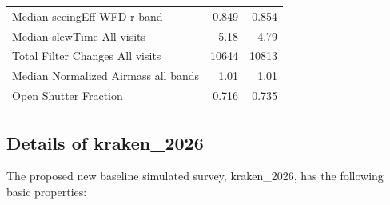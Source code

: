 \documentclass[DM,lsstdraft,authoryear,toc]{lsstdoc}
\begin{document}
\begin{table}
\begin{tabular}{lrr}
Median seeingEff WFD r band                &           0.849  &         0.854 \\
Median slewTime All visits                 &           5.18   &         4.79 \\
Total Filter Changes All visits            &          10644   &         10813     \\
Median Normalized Airmass all bands        &          1.01    &         1.01  \\
Open Shutter Fraction                      &          0.716   &         0.735 \\
\bottomrule
\end{tabular}
\label{tab:baseline_comparison}
\end{table}

\subsection{Details of kraken\_2026}

The proposed new baseline simulated survey, kraken\_2026, has the following basic properties:
\end{document}
